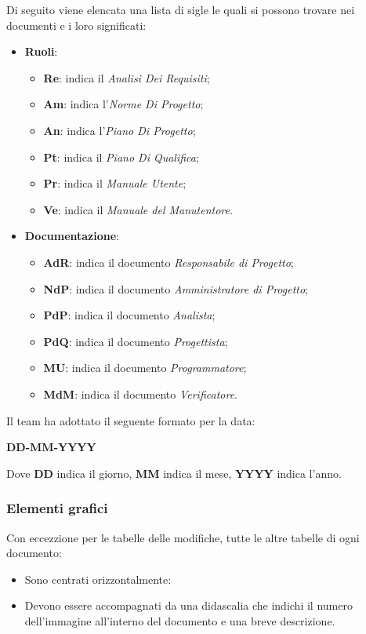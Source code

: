 Di seguito viene elencata una lista di sigle le quali si possono trovare nei documenti e i loro significati:
\begin {itemize}
\item \textbf{Ruoli}:
	\begin {itemize}
	\item \textbf{Re}: indica il \textit{Analisi Dei Requisiti};
	\item \textbf{Am}: indica l’\textit{Norme Di Progetto};
	\item \textbf{An}: indica l’\textit{Piano Di Progetto};
	\item \textbf{Pt}: indica il \textit{Piano Di Qualifica};
	\item \textbf{Pr}: indica il \textit{Manuale Utente};
	\item \textbf{Ve}: indica il \textit{Manuale del Manutentore}.
	\end {itemize}
\item \textbf{Documentazione}:
	\begin {itemize}
	\item \textbf{AdR}: indica il documento \textit{Responsabile di Progetto};
	\item \textbf{NdP}: indica il documento \textit{Amministratore di Progetto};
	\item \textbf{PdP}: indica il documento \textit{Analista};
	\item \textbf{PdQ}: indica il documento \textit{Progettista};
	\item \textbf{MU}: indica il documento \textit{Programmatore};
	\item \textbf{MdM}: indica il documento \textit{Verificatore}.
	\end {itemize}
\end {itemize}
Il team ha adottato il seguente formato per la data:
\begin{center}
    \large{\textbf{DD-MM-YYYY}}
\end{center}
Dove \textbf{DD} indica il giorno, \textbf{MM} indica il mese, \textbf{YYYY} indica l'anno.

\subsubsection{Elementi grafici}

Con eccezzione per le tabelle delle modifiche, tutte le altre tabelle di ogni documento:
\begin {itemize}
\item Sono centrati orizzontalmente:
\item Devono essere accompagnati da una didascalia che indichi il numero dell'immagine all'interno del documento e una breve descrizione.
\end {itemize}

